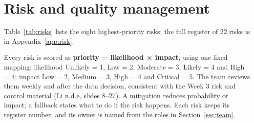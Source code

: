 \section{Risk and quality management}
\label{sec:risk}

Table~\ref{tab:risks} lists the eight highest-priority risks; the full register of 22 risks is in Appendix~\ref{app:risk}.

Every risk is scored as \textbf{priority = likelihood × impact}, using one fixed mapping: likelihood Unlikely = 1, Low = 2, Moderate = 3, Likely = 4 and High = 4; impact Low = 2, Medium = 3, High = 4 and Critical = 5. The team reviews them weekly and after the data decision, consistent with the Week 3 risk and control material (Li n.d.e, slides 8–27). A mitigation reduces probability or impact; a fallback states what to do if the risk happens. Each risk keeps its register number, and its owner is named from the roles in Section~\ref{sec:team}.

